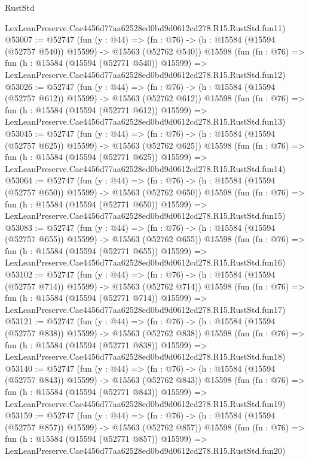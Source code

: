 \begin{lexlean}{RustStd}
\begin{coremodule}
    LexLeanPreserve.Cae4456d77aa62528ed0bd9d0612cd278.R15.RustStd.fun11)
@53007 := @52747
    (fun (y : @44) =>
    (fn : @76) -> (h : @15584 (@15594 (@52757 @540)) @15599) -> @15563 (@52762 @540))
    @15598
    (fun (fn : @76) =>
    fun (h : @15584 (@15594 (@52771 @540)) @15599) =>
    LexLeanPreserve.Cae4456d77aa62528ed0bd9d0612cd278.R15.RustStd.fun12)
@53026 := @52747
    (fun (y : @44) =>
    (fn : @76) -> (h : @15584 (@15594 (@52757 @612)) @15599) -> @15563 (@52762 @612))
    @15598
    (fun (fn : @76) =>
    fun (h : @15584 (@15594 (@52771 @612)) @15599) =>
    LexLeanPreserve.Cae4456d77aa62528ed0bd9d0612cd278.R15.RustStd.fun13)
@53045 := @52747
    (fun (y : @44) =>
    (fn : @76) -> (h : @15584 (@15594 (@52757 @625)) @15599) -> @15563 (@52762 @625))
    @15598
    (fun (fn : @76) =>
    fun (h : @15584 (@15594 (@52771 @625)) @15599) =>
    LexLeanPreserve.Cae4456d77aa62528ed0bd9d0612cd278.R15.RustStd.fun14)
@53064 := @52747
    (fun (y : @44) =>
    (fn : @76) -> (h : @15584 (@15594 (@52757 @650)) @15599) -> @15563 (@52762 @650))
    @15598
    (fun (fn : @76) =>
    fun (h : @15584 (@15594 (@52771 @650)) @15599) =>
    LexLeanPreserve.Cae4456d77aa62528ed0bd9d0612cd278.R15.RustStd.fun15)
@53083 := @52747
    (fun (y : @44) =>
    (fn : @76) -> (h : @15584 (@15594 (@52757 @655)) @15599) -> @15563 (@52762 @655))
    @15598
    (fun (fn : @76) =>
    fun (h : @15584 (@15594 (@52771 @655)) @15599) =>
    LexLeanPreserve.Cae4456d77aa62528ed0bd9d0612cd278.R15.RustStd.fun16)
@53102 := @52747
    (fun (y : @44) =>
    (fn : @76) -> (h : @15584 (@15594 (@52757 @714)) @15599) -> @15563 (@52762 @714))
    @15598
    (fun (fn : @76) =>
    fun (h : @15584 (@15594 (@52771 @714)) @15599) =>
    LexLeanPreserve.Cae4456d77aa62528ed0bd9d0612cd278.R15.RustStd.fun17)
@53121 := @52747
    (fun (y : @44) =>
    (fn : @76) -> (h : @15584 (@15594 (@52757 @838)) @15599) -> @15563 (@52762 @838))
    @15598
    (fun (fn : @76) =>
    fun (h : @15584 (@15594 (@52771 @838)) @15599) =>
    LexLeanPreserve.Cae4456d77aa62528ed0bd9d0612cd278.R15.RustStd.fun18)
@53140 := @52747
    (fun (y : @44) =>
    (fn : @76) -> (h : @15584 (@15594 (@52757 @843)) @15599) -> @15563 (@52762 @843))
    @15598
    (fun (fn : @76) =>
    fun (h : @15584 (@15594 (@52771 @843)) @15599) =>
    LexLeanPreserve.Cae4456d77aa62528ed0bd9d0612cd278.R15.RustStd.fun19)
@53159 := @52747
    (fun (y : @44) =>
    (fn : @76) -> (h : @15584 (@15594 (@52757 @857)) @15599) -> @15563 (@52762 @857))
    @15598
    (fun (fn : @76) =>
    fun (h : @15584 (@15594 (@52771 @857)) @15599) =>
    LexLeanPreserve.Cae4456d77aa62528ed0bd9d0612cd278.R15.RustStd.fun20)

\end{coremodule}
\end{lexlean}
